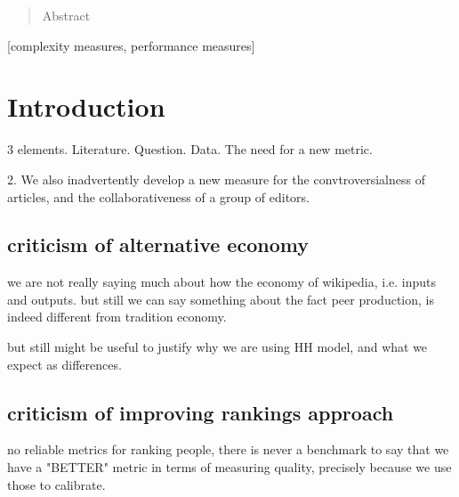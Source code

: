 \documentclass{acm_proc_article-sp}
\begin{document}
\date{14 February 2014}

\maketitle
\begin{abstract}
Abstract
\end{abstract}

[complexity measures, performance measures]



\section{Introduction}

3 elements. Literature. Question. Data. The need for a new metric.

2. We also inadvertently develop a new measure for the convtroversialness of articles, and the collaborativeness of a group of editors.

\subsection{criticism of alternative economy}
we are not really saying much about how the economy of wikipedia, i.e. inputs and outputs.
but still we can say something about the fact peer production, is indeed different from tradition economy.

but still might be useful to justify why we are using HH model, and what we expect as differences. 


\subsection{criticism of improving rankings approach}
no reliable metrics for ranking people, there is never a benchmark to say that we have a "BETTER" metric in terms of measuring quality, precisely because we use those to calibrate.
\end{document}
